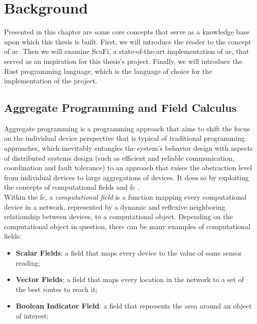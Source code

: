 
\chapter{Background}
\label{chap:background}
Presented in this chapter are some core concepts that serve as a knowledge base upon which this thesis is built.
First, we will introduce the reader to the concept of \ac{ac}. Then we will examine ScaFi, a state-of-the-art implementation of \ac{ac}, that served as an inspiration for this thesis's project.
Finally, we will introduce the Rust programming language, which is the language of choice for the implementation of the project.

\section{Aggregate Programming and Field Calculus}
Aggregate programming \cite{Beal2016} is a programming approach that aims to shift the focus on the individual device perspective that is typical of traditional programming approaches, which
inevitably entangles the system's behavior design with aspects of distributed systems design (such as efficient and reliable communication, coordination and fault tolerance) to an approach that raises
the abstraction level from individual devices to large aggregations of devices. It does so by exploiting the concepts of computational fields and \ac{fc} \cite{10.1145/3285956, 10.1007/978-3-642-45364-9_11}.\\

Within the \ac{fc}, a \textit{computational field} is a function mapping every computational device in a network, represented by a dynamic and reflexive neighboring relationship between devices, to a computational object.
Depending on the computational object in question, there can be many examples of computational fields:
\begin{itemize}
    \item \textbf{Scalar Fields}: a field that maps every device to the value of some sensor reading;
    \item \textbf{Vector Fields}: a field that maps every location in the network to a set of the best routes to reach it;
    \item \textbf{Boolean Indicator Field}: a field that represents the area around an object of interest;
\end{itemize}


